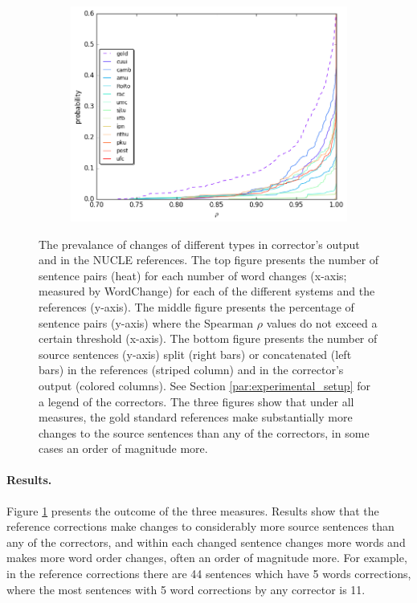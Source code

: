 \documentclass[letter,11pt]{article}
\begin{document}
\begin{figure}[tbp]
\begin{subfigure}[]{0.4\textwidth}
    \includegraphics[width = \textwidth]{spearman_ecdf}
  \end{subfigure}
  \caption{\label{fig:over-conservatism}
    The prevalance of changes of different types in corrector's output and in the NUCLE references.
    The top figure presents the number of sentence pairs (heat) for each number of word changes
    (x-axis; measured by {\sc WordChange}) for each of the different systems and the references (y-axis).
    The middle figure presents the percentage of sentence pairs (y-axis) where the
    Spearman $\rho$ values do not exceed a certain threshold (x-axis).
    The bottom figure presents the number of source sentences (y-axis) split (right bars) or concatenated
    (left bars) in the references (striped column) and in the corrector's output (colored columns).
    See Section \ref{par:experimental_setup} for a legend of the correctors.
    The three figures show that under all measures, the gold standard references make
    substantially more changes to the source sentences than any of the correctors,
    in some cases an order of magnitude more.
  }
\end{figure}


\paragraph{Results.}
Figure \ref{fig:over-conservatism} presents the outcome of the three measures. 
Results show that the reference corrections make changes to considerably more source sentences than any of the correctors, and within each changed sentence changes more words and makes more word order changes, often an order of magnitude more. For example, in the reference corrections there are 44 sentences which have 5 words corrections, where the most sentences with 5 word corrections by any corrector is 11.
\end{document}
